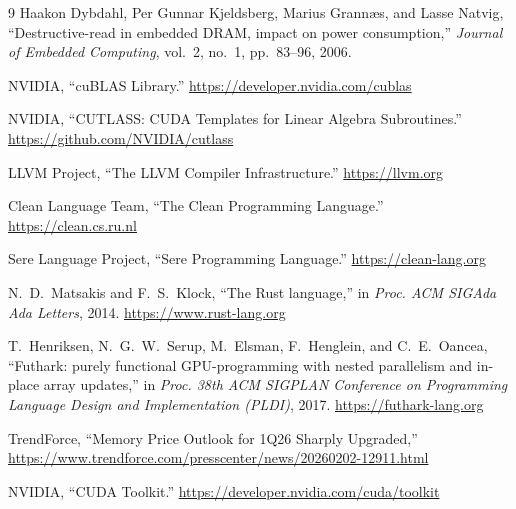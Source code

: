 \documentclass[a4paper]{article}
\renewcommand{\refname}{TÀI LIỆU THAM KHẢO}
\begin{document}
	\addcontentsline{toc}{section}{\refname}
	\begin{thebibliography}{9}
		Haakon Dybdahl, Per Gunnar Kjeldsberg, Marius Grann{\ae}s, and Lasse Natvig,
		``Destructive-read in embedded DRAM, impact on power consumption,''
		\emph{Journal of Embedded Computing}, vol.~2, no.~1, pp.~83--96, 2006.
		
		NVIDIA, ``cuBLAS Library.'' \url{https://developer.nvidia.com/cublas}
		
		NVIDIA, ``CUTLASS: CUDA Templates for Linear Algebra Subroutines.'' \url{https://github.com/NVIDIA/cutlass}

		LLVM Project, ``The LLVM Compiler Infrastructure.'' \url{https://llvm.org}
		
		Clean Language Team, ``The Clean Programming Language.'' \url{https://clean.cs.ru.nl}
		
		Sere Language Project, ``Sere Programming Language.'' \url{https://clean-lang.org}
		
		N.~D.~Matsakis and F.~S.~Klock, ``The Rust language,'' in \emph{Proc. ACM SIGAda Ada Letters}, 2014. \url{https://www.rust-lang.org}
		
		T.~Henriksen, N.~G.~W.~Serup, M.~Elsman, F.~Henglein, and C.~E.~Oancea, ``Futhark: purely functional GPU-programming with nested parallelism and in-place array updates,'' in \emph{Proc. 38th ACM SIGPLAN Conference on Programming Language Design and Implementation (PLDI)}, 2017. \url{https://futhark-lang.org}
		
		TrendForce, ``Memory Price Outlook for 1Q26 Sharply Upgraded,''
		\url{https://www.trendforce.com/presscenter/news/20260202-12911.html}
		
		NVIDIA, ``CUDA Toolkit.'' \url{https://developer.nvidia.com/cuda/toolkit}

	\end{thebibliography}
	
\end{document}
